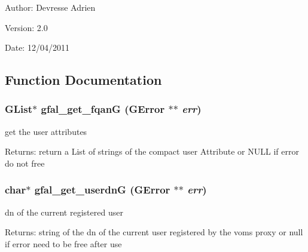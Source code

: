 \begin{Desc}
\item[Author:]Devresse Adrien \end{Desc}
\begin{Desc}
\item[Version:]2.0 \end{Desc}
\begin{Desc}
\item[Date:]12/04/2011 \end{Desc}


\subsection{Function Documentation}
\subsubsection{\setlength{\rightskip}{0pt plus 5cm}GList$\ast$ gfal\_\-get\_\-fqan\-G (GError $\ast$$\ast$ {\em err})}\label{gfal__voms__if_8c_9e4e576664ae9bca61727287f4f429bf}


get the user attributes 

\begin{Desc}
\item[Returns:]return a List of strings of the compact user Attribute or NULL if error do not free \end{Desc}
\subsubsection{\setlength{\rightskip}{0pt plus 5cm}char$\ast$ gfal\_\-get\_\-userdn\-G (GError $\ast$$\ast$ {\em err})}\label{gfal__voms__if_8c_50fa65b43095debd77e0cf6fb6645109}


dn of the current registered user 

\begin{Desc}
\item[Returns:]string of the dn of the current user registered by the voms proxy or null if error need to be free after use \end{Desc}
